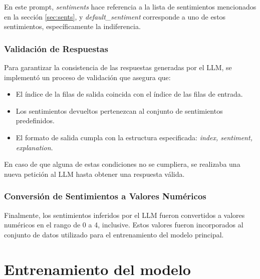 En este prompt, \textit{sentiments} hace referencia a la lista de sentimientos 
mencionados en la sección \ref{sec:sents}, y \textit{default\_sentiment} corresponde a 
uno de estos sentimientos, específicamente la indiferencia.

\subsubsection{Validación de Respuestas}

Para garantizar la consistencia de las respuestas generadas por el LLM, se 
implementó un proceso de validación que asegura que:
\begin{itemize}
\item El \'indice de la filas de salida coincida con el \'indice de las filas de entrada.

\item Los sentimientos devueltos pertenezcan al conjunto de sentimientos predefinidos.

\item El formato de salida cumpla con la estructura especificada: 
\textit{index, sentiment, explanation}.
\end{itemize}
En caso de que alguna de estas condiciones no se cumpliera, se realizaba una 
nueva petición al LLM hasta obtener una respuesta válida.

\subsubsection{Conversión de Sentimientos a Valores Numéricos}

Finalmente, los sentimientos inferidos por el LLM fueron convertidos a 
valores numéricos en el rango de 0 a 4, inclusive. Estos valores fueron 
incorporados al conjunto de datos utilizado para el entrenamiento del 
modelo principal.

\section{Entrenamiento del modelo}

